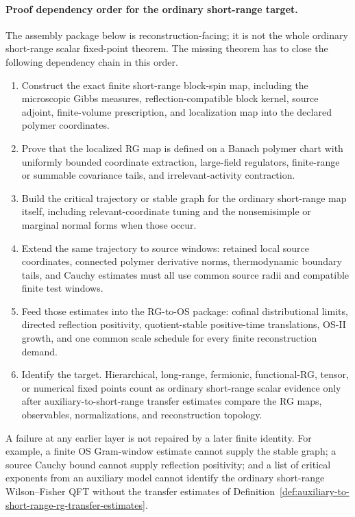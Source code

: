 \paragraph{Proof dependency order for the ordinary short-range target.}
The assembly package below is reconstruction-facing; it is not the whole
ordinary short-range scalar fixed-point theorem.  The missing theorem has to
close the following dependency chain in this order.
\begin{enumerate}
  \item Construct the exact finite short-range block-spin map, including the
  microscopic Gibbs measures, reflection-compatible block kernel, source
  adjoint, finite-volume prescription, and localization map into the declared
  polymer coordinates.
  \item Prove that the localized RG map is defined on a Banach polymer chart
  with uniformly bounded coordinate extraction, large-field regulators,
  finite-range or summable covariance tails, and irrelevant-activity
  contraction.
  \item Build the critical trajectory or stable graph for the ordinary
  short-range map itself, including relevant-coordinate tuning and the
  nonsemisimple or marginal normal forms when those occur.
  \item Extend the same trajectory to source windows: retained local source
  coordinates, connected polymer derivative norms, thermodynamic boundary
  tails, and Cauchy estimates must all use common source radii and compatible
  finite test windows.
  \item Feed those estimates into the RG-to-OS package: cofinal
  distributional limits, directed reflection positivity, quotient-stable
  positive-time translations, OS-II growth, and one common scale schedule for
  every finite reconstruction demand.
  \item Identify the target.  Hierarchical, long-range, fermionic,
  functional-RG, tensor, or numerical fixed points count as ordinary
  short-range scalar evidence only after auxiliary-to-short-range transfer
  estimates compare the RG maps, observables, normalizations, and
  reconstruction topology.
\end{enumerate}
A failure at any earlier layer is not repaired by a later finite identity.
For example, a finite OS Gram-window estimate cannot supply the stable graph;
a source Cauchy bound cannot supply reflection positivity; and a list of
critical exponents from an auxiliary model cannot identify the ordinary
short-range Wilson--Fisher QFT without the transfer estimates of
Definition~\ref{def:auxiliary-to-short-range-rg-transfer-estimates}.

